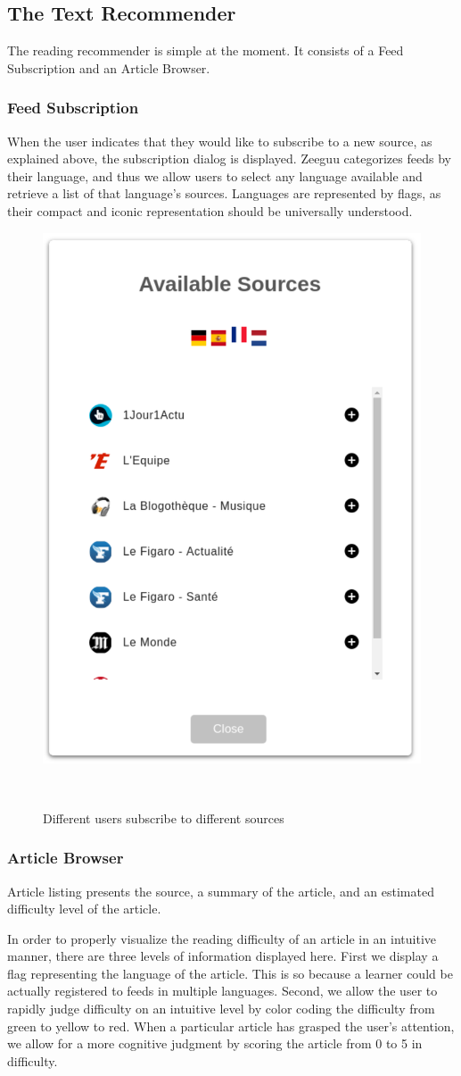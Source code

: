 \subsection{The Text Recommender}
The reading recommender is simple at the moment. It consists of a Feed Subscription and an Article Browser.

\subsubsection{Feed Subscription}
When the user indicates that they would like to subscribe to a new source, as explained above, the subscription dialog is displayed. Zeeguu categorizes feeds by their language, and thus we allow users to select any language available and retrieve a list of that language's sources. Languages are represented by flags, as their compact and iconic representation should be universally understood.

\begin{figure}[h!]
\centering
  \includegraphics[width=0.4\columnwidth]{figures/available_sources}
  \caption{Different users subscribe to different sources}~\label{fig:system_subscriptions}
\end{figure}


\subsubsection{Article Browser}

Article listing presents the source, a summary of the article, and an estimated difficulty level of the article.

In order to properly visualize the reading difficulty of an article in an intuitive manner, there are three levels of information displayed here. First we display a flag representing the language of the article. This is so because a learner could be actually registered to feeds in multiple languages. Second, we allow the user to rapidly judge difficulty on an intuitive level by color coding the difficulty from green to yellow to red. When a particular article has grasped the user's attention, we allow for a more cognitive judgment by scoring the article from 0 to 5 in difficulty.

